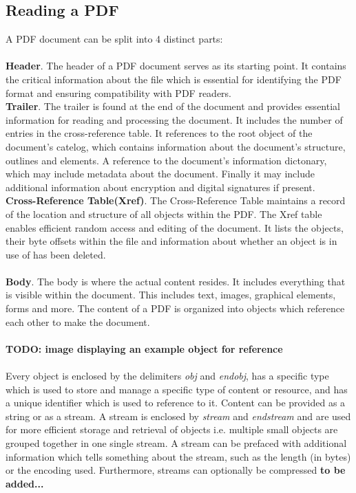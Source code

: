 \subsection{Reading a PDF}
A PDF document can be split into 4 distinct parts: 
\\\\
\textbf{Header}. The header of a PDF document serves as its starting point. It contains the critical information about the file which is essential for identifying the PDF format and ensuring compatibility with PDF readers. \\
\textbf{Trailer}. The trailer is found at the end of the document and provides essential information for reading and processing the document. It includes the number of entries in the cross-reference table. It references to the root object of the document's catelog, which contains information about the document's structure, outlines and elements. A reference to the document's information dictonary, which may include metadata about the document. Finally it may include additional information about encryption and digital signatures if present. \\
\textbf{Cross-Reference Table(Xref)}. The Cross-Reference Table maintains a record of the location and structure of all objects within the PDF. The Xref table enables efficient random access and editing of the document. It lists the objects, their byte offsets within the file and information about whether an object is in use of has been deleted. 
\\\\
\textbf{Body}. The body is where the actual content resides. It includes everything that is visible within the document. This includes text, images, graphical elements, forms and more. The content of a PDF is organized into objects which reference each other to make the document. 
\\\\
\textbf{TODO: image displaying an example object for reference}
\\\\
Every object is enclosed by the delimiters \textit{obj} and \textit{endobj}, has a specific type which is used to store and manage a specific type of content or resource, and has a unique identifier which is used to reference to it. Content can be provided as a string or as a stream. A stream is enclosed by \textit{stream} and \textit{endstream} and are used for more efficient storage and retrieval of objects i.e. multiple small objects are grouped together in one single stream. A stream can be prefaced with additional information which tells something about the stream, such as the length (in bytes) or the encoding used. Furthermore, streams can optionally be compressed \textbf{to be added...}
